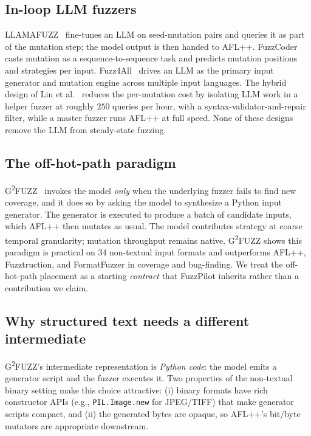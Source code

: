 \documentclass[11pt]{article}
\begin{document}
\subsection{In-loop LLM fuzzers}
\label{sec:bg:inloop}

LLAMAFUZZ~\cite{wang2024llamafuzz} fine-tunes an LLM on seed-mutation
pairs and queries it as part of the mutation step; the model output
is then handed to AFL++. FuzzCoder~\cite{liu2024fuzzcoder} casts
mutation as a sequence-to-sequence task and predicts mutation
positions and strategies per input.
Fuzz4All~\cite{xia2024fuzz4all} drives an LLM as the primary input
generator and mutation engine across multiple input languages.
The hybrid design of Lin et al.~\cite{lin2025hybrid} reduces
the per-mutation cost by isolating LLM work in a helper fuzzer at
roughly $250$ queries per hour, with a syntax-validator-and-repair
filter, while a master fuzzer runs AFL++ at full speed. None of
these designs remove the LLM from steady-state fuzzing.

\subsection{The off-hot-path paradigm}
\label{sec:bg:offhot}

G\textsuperscript{2}FUZZ~\cite{liu2025g2fuzz} invokes the model
\emph{only} when the underlying fuzzer fails to find new coverage,
and it does so by asking the model to synthesize a Python input
generator. The generator is executed to produce a batch of candidate
inputs, which AFL++ then mutates as usual. The model contributes
strategy at coarse temporal granularity; mutation throughput remains
native. G\textsuperscript{2}FUZZ shows this paradigm is practical
on $34$ non-textual input formats and outperforms AFL++,
Fuzztruction, and FormatFuzzer in coverage and bug-finding.
We treat the off-hot-path placement as a starting \emph{contract}
that FuzzPilot inherits rather than a contribution we claim.

\subsection{Why structured text needs a different intermediate}
\label{sec:bg:text}

G\textsuperscript{2}FUZZ's intermediate representation is
\emph{Python code}: the model emits a generator script and the
fuzzer executes it. Two properties of the non-textual binary
setting make this choice attractive: (i) binary formats have rich
constructor APIs (e.g., \texttt{PIL.Image.new} for JPEG/TIFF) that
make generator scripts compact, and (ii) the generated bytes are
opaque, so AFL++'s bit/byte mutators are appropriate downstream.
\end{document}
